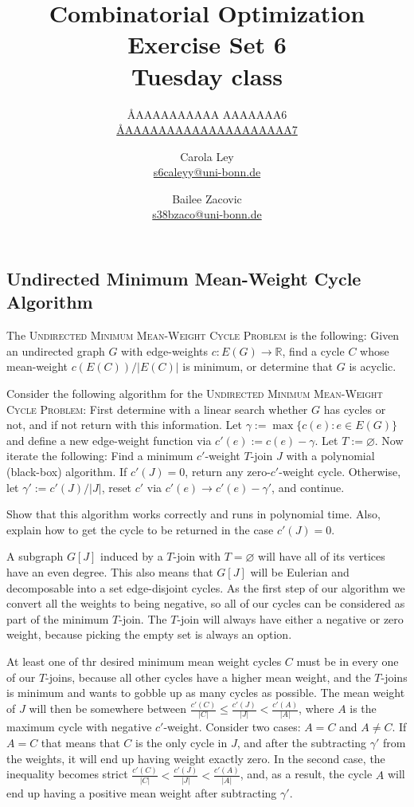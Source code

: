 \documentclass{article}
\title{Combinatorial Optimization \\ Exercise Set 6 \\ Tuesday class}
\author{
  \AA{AAAAAAAAAA AAAAAAA}{6} \\
  \href{mailto:\AA{AAAAAAAAAAAAAAAAAAAA}{7}}{\AA{AAAAAAAAAAAAAAAAAAAA}{7}}
  \and
  Carola Ley \\
  \href{mailto:s6caleyy@uni-bonn.de}{s6caleyy@uni-bonn.de}
  \and
  Bailee Zacovic \\
  \href{mailto:s38bzaco@uni-bonn.de}{s38bzaco@uni-bonn.de}
}
\let\emptyset\varnothing
\newcommand{\R}{\mathbb{R}}
\begin{document}
  \maketitle

  \setcounter{section}{6}
  \subsection{Undirected Minimum Mean-Weight Cycle Algorithm}
  \begin{centerframebox}
    The \textsc{Undirected Minimum Mean-Weight Cycle Problem}
    is the following: Given an undirected graph $G$ with edge-weights $c : E(G) \to \R$,
    find a cycle $C$ whose mean-weight $c(E(C))/|E(C)|$ is minimum, or determine that
    $G$ is acyclic.

    Consider the following algorithm for the \textsc{Undirected Minimum Mean-Weight Cycle Problem}:
    First determine with a linear search whether $G$ has cycles or not, and if not return with this information.
    Let $\gamma := \max\{c(e) : e \in E(G)\}$ and define a new edge-weight function via $c'(e) := c(e) - \gamma$.
    Let $T := \emptyset$.
    Now iterate the following: Find a minimum $c'$-weight $T$-join $J$ with a polynomial (black-box) algorithm.
    If $c'(J) = 0$, return any zero-$c'$-weight cycle.
    Otherwise, let $\gamma':= c'(J)/|J|$, reset $c'$ via $c'(e) \rightarrow c'(e) - \gamma'$, and continue.

    Show that this algorithm works correctly and runs in polynomial time.
    Also, explain how to get the cycle to be returned in the case $c'(J) = 0$.
  \end{centerframebox}
  A subgraph $G[J]$ induced by a $T$-join with $T = \emptyset$ will have all of its vertices have an even degree.
  This also means that $G[J]$ will be Eulerian and decomposable into a set edge-disjoint cycles.
  As the first step of our algorithm we convert all the weights to being negative,
  so all of our cycles can be considered as part of the minimum $T$-join.
  The $T$-join will always have either a negative or zero weight, because picking the empty set is always an option.

  At least one of thr desired minimum mean weight cycles $C$ must be in every one of our $T$-joins,
  because all other cycles have a higher mean weight, and the $T$-joins is minimum and wants to gobble up as many cycles as possible.
  The mean weight of $J$ will then be somewhere between $\frac{c'(C)}{|C|} \leq \frac{c'(J)}{|J|} < \frac{c'(A)}{|A|}$,
  where $A$ is the maximum cycle with negative $c'$-weight.
  Consider two cases: $A = C$ and $A \neq C$. If $A = C$ that means that $C$ is the only cycle in $J$,
  and after the subtracting $\gamma'$ from the weights, it will end up having weight exactly zero.
  In the second case, the inequality becomes strict $\frac{c'(C)}{|C|} < \frac{c'(J)}{|J|} < \frac{c'(A)}{|A|}$,
  and, as a result, the cycle $A$ will end up having a positive mean weight after subtracting $\gamma'$.
\end{document}
